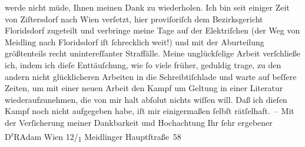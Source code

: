 \begin{ledgroupsized}[t]{13cm}
               werde nicht müde, Ihnen meinen Dank zu wiederholen.\pend
           \pstart
           Ich bin seit einiger Zeit von Ziſtersdorf nach
                  Wien verſetzt, hier proviſoriſch dem Bezirksgericht Floridsdorf zugeteilt und verbringe
               meine Tage auf der Elektriſchen (der Weg von Meidling nach Floridsdorf iſt ſchrecklich
               weit!) und mit der Aburteilung größtenteils recht unintereſſanter Straffälle.\pend
           \pstart
           Meine unglückſelige Arbeit verſchließe ich, indem ich dieſe Enttäuſchung, wie ſo
               viele früher, geduldig trage, zu den andern nicht glücklicheren Arbeiten in die
               Schreibtiſchlade und warte auf beſſere Zeiten, um mit einer neuen Arbeit den Kampf um
               Geltung in einer Literatur wiederaufzunehmen, die von mir halt abſolut nichts wiſſen
               will. Daß ich die{\pb}ſen Kampf noch nicht aufgegeben
               habe, iſt mir einigermaßen ſelbſt rätſelhaft. –\pend
           \pstart
           Mit der Verſicherung meiner Dankbarkeit und Hochachtung Ihr ſehr ergebener\pend
           \pstart \spacefill\mbox{D\textsuperscript{r}RAdam}\pend{}\pstart
           \noindent{}Wien 12/\textsubscript{1} Meidlinger
                     Hauptſtraße 58\pend
           
         
         \endnumbering{}\end{ledgroupsized}  \newcommand{\dateiname}{L02219}\newcommand{\titel}{Robert Adam an Arthur Schnitzler, 26. 9. 1915}\newcommand{\editorInnen}{Martin Anton Müller und Gerd-Hermann Susen}
      